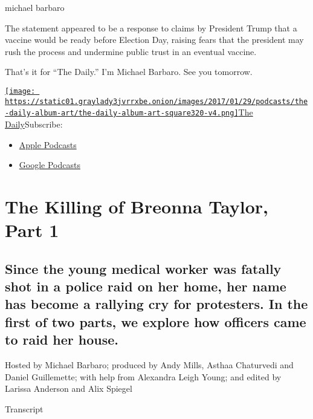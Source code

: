 michael barbaro

The statement appeared to be a response to claims by President Trump
that a vaccine would be ready before Election Day, raising fears that
the president may rush the process and undermine public trust in an
eventual vaccine.

That's it for ``The Daily.'' I'm Michael Barbaro. See you tomorrow.

\href{https://www.nytimes3xbfgragh.onion/column/the-daily}{\texttt{[image: https://static01.graylady3jvrrxbe.onion/images/2017/01/29/podcasts/the-daily-album-art/the-daily-album-art-square320-v4.png]}The
Daily}Subscribe:

\begin{itemize}
\tightlist
\item
  \href{https://itunes.apple.com/us/podcast/id1200361736}{Apple
  Podcasts}
\item
  \href{https://www.google.com/podcasts?feed=aHR0cHM6Ly9yc3MuYXJ0MTkuY29tL3RoZS1kYWlseQ\%3D\%3D}{Google
  Podcasts}
\end{itemize}

\hypertarget{the-killing-of-breonna-taylor-part-1-1}{%
\section{The Killing of Breonna Taylor, Part
1}\label{the-killing-of-breonna-taylor-part-1-1}}

\hypertarget{since-the-young-medical-worker-was-fatally-shot-in-a-police-raid-on-her-home-her-name-has-become-a-rallying-cry-for-protesters-in-the-first-of-two-parts-we-explore-how-officers-came-to-raid-her-house-1}{%
\subsection{Since the young medical worker was fatally shot in a police
raid on her home, her name has become a rallying cry for protesters. In
the first of two parts, we explore how officers came to raid her
house.}\label{since-the-young-medical-worker-was-fatally-shot-in-a-police-raid-on-her-home-her-name-has-become-a-rallying-cry-for-protesters-in-the-first-of-two-parts-we-explore-how-officers-came-to-raid-her-house-1}}

Hosted by Michael Barbaro; produced by Andy Mills, Asthaa Chaturvedi and
Daniel Guillemette; with help from Alexandra Leigh Young; and edited by
Larissa Anderson and Alix Spiegel

Transcript

